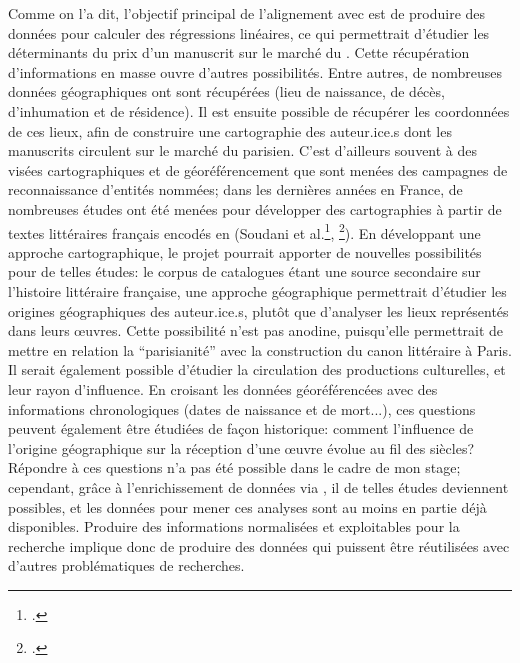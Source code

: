 Comme on l'a dit, l'objectif principal de l'alignement avec \wkd{} est de produire des données pour calculer des régressions linéaires, ce qui permettrait d'étudier les déterminants du prix d'un manuscrit sur le marché du . Cette récupération d'informations en masse ouvre d'autres possibilités. Entre autres, de nombreuses données géographiques ont sont récupérées (lieu de naissance, de décès, d'inhumation et de résidence). Il est ensuite possible  de récupérer les coordonnées de ces lieux, afin de construire une cartographie des auteur.ice.s dont les manuscrits circulent sur le marché du  parisien. C'est d'ailleurs souvent à des visées cartographiques et de géoréférencement que sont menées des campagnes de reconnaissance d'entités nommées; dans les dernières années en France, de nombreuses études ont été menées pour développer des cartographies à partir de textes littéraires français encodés en \tei{} (Soudani et al.\footcite[p.4-5]{soudani_adaptation_2018}, \footcite[p. 63-66]{frontini_annotation_2016}). En développant une approche cartographique, le projet \mssktb{} pourrait apporter de nouvelles possibilités pour de telles études: le corpus de catalogues étant une source secondaire sur l'histoire littéraire française, une approche géographique permettrait d'étudier les origines géographiques des auteur.ice.s, plutôt que d'analyser les lieux représentés dans leurs œuvres. Cette possibilité n'est pas anodine, puisqu'elle permettrait de mettre en relation la \enquote{parisianité} avec la construction du canon littéraire à Paris. Il serait également possible d'étudier la circulation des productions culturelles, et leur rayon d'influence. En croisant les données géoréférencées avec des informations chronologiques (dates de naissance et de mort...), ces questions peuvent également être étudiées de façon historique: comment l'influence de l'origine géographique sur la réception d'une œuvre évolue au fil des siècles? Répondre à ces questions n'a pas été possible dans le cadre de mon stage; cependant, grâce à l'enrichissement de données via \sparql{}, il de telles études deviennent possibles, et les données pour mener ces analyses sont au moins en partie déjà disponibles. Produire des informations normalisées et exploitables pour la recherche implique donc de produire des données qui puissent être réutilisées avec d'autres problématiques de recherches.

